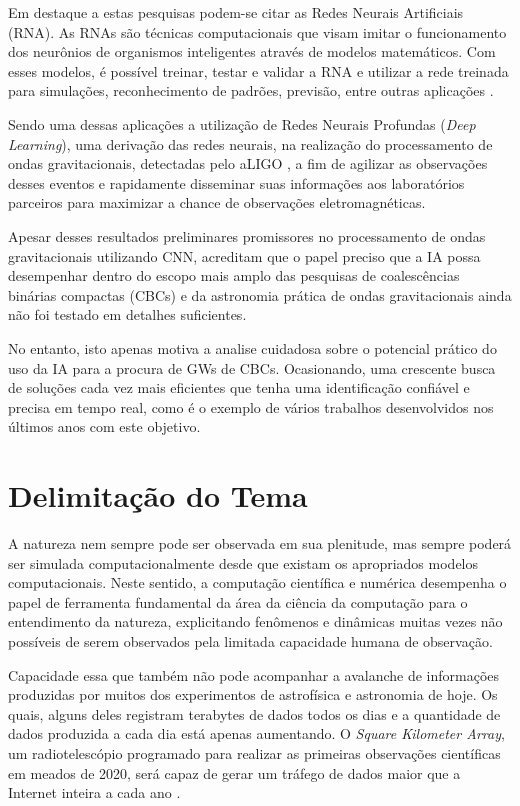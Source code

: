 Em destaque a estas pesquisas podem-se citar as Redes Neurais Artificiais (RNA). As RNAs são técnicas computacionais que visam imitar o funcionamento dos neurônios de organismos inteligentes através de modelos matemáticos. Com esses modelos, é possível treinar, testar e validar a RNA e utilizar a rede treinada para simulações, reconhecimento de padrões, previsão, entre outras aplicações \cite{haykin2011neural}.

Sendo uma dessas aplicações a utilização de Redes Neurais Profundas (\textit{Deep Learning}), uma derivação das redes neurais, na realização do processamento de ondas gravitacionais, detectadas pelo aLIGO \cite{shen2017denoising,PhysRevLett.120.141103,krastev2019real,gebhard2019convolutional,mukund2017transient,kim2015application, george2017deep, george2018deep, PhysRevD.100.103025, Lin2019, Luo2020}, a fim de agilizar as observações desses eventos e rapidamente disseminar suas informações aos laboratórios parceiros para maximizar a chance de observações eletromagnéticas.

Apesar desses resultados preliminares promissores no processamento de ondas gravitacionais utilizando CNN, \cite{PhysRevD.100.063015} acreditam que o papel preciso que a IA possa desempenhar dentro do escopo mais amplo das pesquisas de coalescências binárias compactas (CBCs) e da astronomia prática de ondas gravitacionais ainda não foi testado em detalhes suficientes.

No entanto, isto apenas motiva a analise cuidadosa sobre o potencial prático do uso da IA para a procura de GWs de CBCs. Ocasionando, uma crescente busca de soluções cada vez mais eficientes que tenha uma identificação confiável e precisa em tempo real, como é o exemplo de vários trabalhos desenvolvidos nos últimos anos com este objetivo.

\section{Delimitação do Tema}

A natureza nem sempre pode ser observada em sua plenitude, mas sempre poderá ser simulada computacionalmente desde que existam os apropriados modelos computacionais. Neste sentido, a computação científica e numérica desempenha o papel de ferramenta fundamental da área da ciência da computação para o entendimento da natureza, explicitando fenômenos e dinâmicas muitas vezes não possíveis de serem observados pela limitada capacidade humana de observação.

Capacidade essa que também não pode acompanhar a avalanche de informações produzidas por muitos dos experimentos de astrofísica e astronomia de hoje. Os quais, alguns deles registram terabytes de dados todos os dias e a quantidade de dados produzida a cada dia está apenas aumentando. O \textit{Square Kilometer Array}, um radiotelescópio programado para realizar as primeiras observações científicas em meados de 2020, será capaz de gerar um tráfego de dados maior que a Internet inteira a cada ano \cite{ska-dewdney2009square, scaife2020big, greig2020reionization}.

